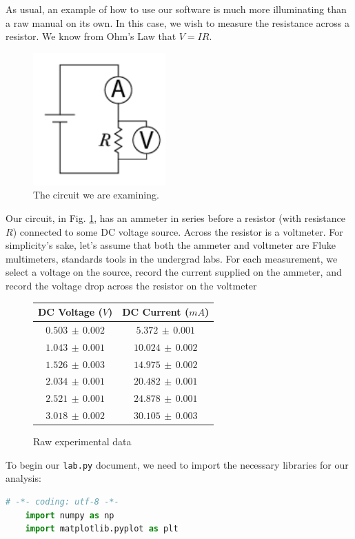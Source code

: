 \documentclass[12pt]{article}
\begin{document}
{As usual, an example of how to use our software is much more illuminating than a raw manual on its own. In this case, we wish to measure the resistance across a resistor. We know from Ohm's Law that $V = IR$. 

\begin{figure}[!ht]
  \centering
    \includegraphics[width=2in]{assets/circuit.png}
  \caption{\textsf{The circuit we are examining.}}
  \label{fig:ex_circuit}
\end{figure}

Our circuit, in Fig. \ref{fig:ex_circuit}, has an ammeter in series before a resistor (with resistance $R$) connected to some DC voltage source. Across the resistor is a voltmeter. For simplicity's sake, let's assume that both the ammeter and voltmeter are Fluke multimeters, standards tools in the undergrad labs. For each measurement, we select a voltage on the source, record the current supplied on the ammeter, and record the voltage drop across the resistor on the voltmeter

\begin{figure}[!ht]
  \centering
  \begin{tabular}{c | c}
    DC Voltage ($V$) & DC Current ($mA$) \\\hline
    $0.503\,\pm\,0.002$ & $5.372\,\pm\,0.001$ \\
    $1.043\,\pm\,0.001$ & $10.024\,\pm\,0.002$ \\
    $1.526\,\pm\,0.003$ & $14.975\,\pm\,0.002$ \\
    $2.034\,\pm\,0.001$ & $20.482\,\pm\,0.001$ \\
    $2.521\,\pm\,0.001$ & $24.878\,\pm\,0.001$ \\
    $3.018\,\pm\,0.002$ & $30.105\,\pm\,0.003$
  \end{tabular}
  \caption{\textsf{Raw experimental data}}
  \label{tab:ex_exprdata}
\end{figure}

To begin our \texttt{lab.py} document, we need to import the necessary libraries for our analysis:
\begin{framed}
  \begin{lstlisting}[language=Python]
    # -*- coding: utf-8 -*-
    import numpy as np
    import matplotlib.pyplot as plt


\end{lstlisting}
\end{framed}}
\end{document}
